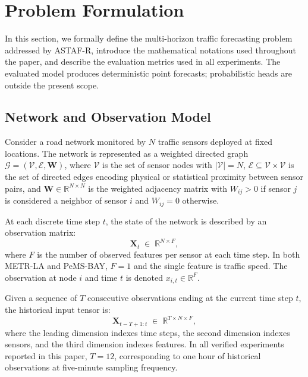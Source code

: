 \documentclass[fleqn,10pt]{wlscirep}
\newcommand{\chg}[1]{{\color{changeblue}#1}}
\begin{document}

\section{Problem Formulation}
\label{sec:problem}

In this section, we formally define the multi-horizon traffic forecasting problem addressed by ASTAF-R, introduce the mathematical notations used throughout the paper, and describe the evaluation metrics used in all experiments. \chg{The evaluated model produces deterministic point forecasts; probabilistic heads are outside the present scope.}

\subsection{Network and Observation Model}

Consider a road network monitored by $N$ traffic sensors deployed
at fixed locations. The network is represented as a weighted directed
graph $\mathcal{G} = (\mathcal{V}, \mathcal{E}, \mathbf{W})$, where
$\mathcal{V}$ is the set of sensor nodes with $|\mathcal{V}| = N$,
$\mathcal{E} \subseteq \mathcal{V} \times \mathcal{V}$ is the set
of directed edges encoding physical or statistical proximity between
sensor pairs, and $\mathbf{W} \in \mathbb{R}^{N \times N}$ is the
weighted adjacency matrix with $W_{ij} > 0$ if sensor $j$ is
considered a neighbor of sensor $i$ and $W_{ij} = 0$ otherwise.

At each discrete time step $t$, the state of the network is
described by an observation matrix:
%
\begin{equation}
    \mathbf{X}_t \;\in\; \mathbb{R}^{N \times F},
    \label{eq:obs}
\end{equation}
%
where $F$ is the number of observed features per sensor at each
time step. \chg{In both METR-LA and PeMS-BAY, $F = 1$
and the single feature is traffic speed.} The observation
at node $i$ and time $t$ is denoted $x_{i,t} \in \mathbb{R}^{F}$.

Given a sequence of $T$ consecutive observations ending at the
current time step $t$, the historical input tensor is:
%
\begin{equation}
    \mathbf{X}_{t-T+1:t} \;\in\; \mathbb{R}^{T \times N \times F},
    \label{eq:input_tensor}
\end{equation}
%
where the leading dimension indexes time steps, the second dimension
indexes sensors, and the third dimension indexes features. In all
verified experiments reported in this paper, $T = 12$, corresponding
to one hour of historical observations at five-minute sampling
frequency.
\end{document}

